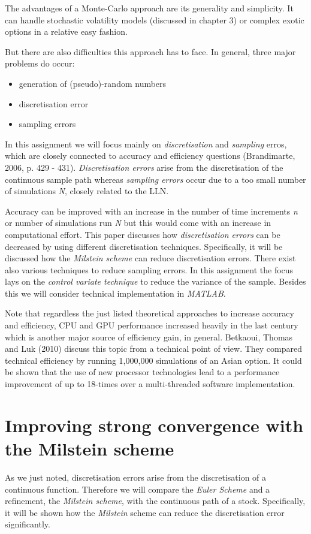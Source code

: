 \documentclass[a4paper,11pt]{article}
\begin{document}
The advantages of a Monte-Carlo approach are its generality and simplicity. It can handle stochastic volatility models (discussed in chapter 3) or complex exotic options in a relative easy fashion.

But there are also difficulties this approach has to face. In general, three major problems do occur:\\

\begin{itemize}
\item generation of (pseudo)-random numbers
\item discretisation error
\item sampling errors\\
\end{itemize}

In this assignment we will focus mainly on \textit{discretisation} and \textit{sampling} erros, which are closely connected to accuracy and efficiency questions (Brandimarte, 2006, p. 429 - 431). \textit{Discretisation errors} arise from the discretisation of the continuous sample path whereas \textit{sampling errors} occur due to a too small number of simulations \textit{N}, closely related to the LLN.

Accuracy can be improved with an increase in the number of time increments \textit{n} or number of simulations run \textit{N} but this would come with an increase in computational effort. This paper discusses how \textit{discretisation errors} can be decreased by using different discretisation techniques. Specifically, it will be discussed how the \textit{Milstein scheme} can reduce discretisation errors. There exist also various techniques to reduce sampling errors. In this assignment the focus lays on the \textit{control variate technique} to reduce the variance of the sample. Besides this we will consider technical implementation in \textit{MATLAB}.

Note that regardless the just listed theoretical approaches to increase accuracy and efficiency, CPU and GPU performance increased heavily in the last century which is another major source of efficiency gain, in general. Betkaoui, Thomas and Luk (2010) discuss this topic from a technical point of view. They compared technical efficiency by running 1,000,000 simulations of an Asian option. It could be shown that the use of new processor technologies lead to a performance improvement of up to 18-times over a multi-threaded software implementation.

\section{Improving strong convergence with the Milstein scheme}
As we just noted, discretisation errors arise from the discretisation of a continuous function. Therefore we will compare the \textit{Euler Scheme} and a refinement, the \textit{Milstein scheme}, with the continuous path of a stock. Specifically, it will be shown how the \textit{Milstein} scheme can reduce the discretisation error significantly.
\end{document}
